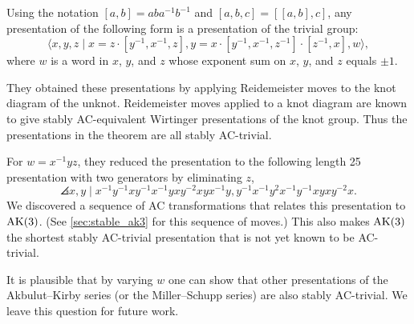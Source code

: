 \begin{theorem*}\label{theorem:MMS}
	Using the notation $[a, b] = a b a^{-1} b^{-1}$ and $[a, b, c] = [[a, b], c]$, any presentation of the following form is a presentation of the trivial group:
	\[
	\langle x, y, z \mid x = z \cdot [y^{-1}, x^{-1}, z], y = x \cdot [y^{-1}, x^{-1}, z^{-1}] \cdot [z^{-1}, x], w \rangle,
	\]
	where $w$ is a word in $x$, $y$, and $z$ whose exponent sum on $x$, $y$, and $z$ equals $\pm 1$.
\end{theorem*}

They obtained these presentations by applying Reidemeister moves to the knot diagram of the unknot.
Reidemeister moves applied to a knot diagram are known to give stably AC-equivalent Wirtinger presentations of the knot group.
Thus the presentations in the theorem are all stably AC-trivial.

For $w = x^{-1}yz$, they reduced the presentation to the following length 25 presentation with two generators by eliminating $z$,
\[
\angles{ x, y \mid
x^{-1}y^{-1}xy^{-1}x^{-1}yxy^{-2}xyx^{-1}y,
y^{-1}x^{-1}y^2x^{-1}y^{-1}xyxy^{-2}x }.
\]
We discovered a sequence of AC transformations that relates this presentation to $\text{AK}(3)$.
(See \autoref{sec:stable_ak3} for this sequence of moves.)
This also makes $\text{AK}(3)$ the shortest stably AC-trivial presentation that is not yet known to be AC-trivial.
\newline

It is plausible that by varying $w$ one can show that other presentations of the Akbulut--Kirby series (or the Miller--Schupp series) are also stably AC-trivial.
We leave this question for future work.